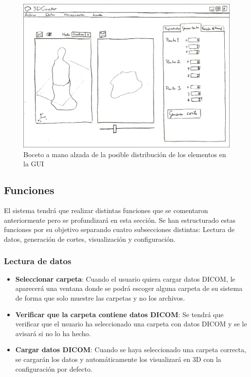 	\begin{figure}[H]
		\centering
		\includegraphics[width=12.5cm]{imagenes/basic_gui}
		\caption{Boceto a mano alzada de la posible distribución de los elementos en la GUI}
		\label{fig:basic_gui}
	\end{figure}
	
	\subsection{Funciones}
	
	El sistema tendrá que realizar distintas funciones que se comentaron anteriormente pero se profundizará en esta sección. Se han estructurado estas funciones por su objetivo separando cuatro subsecciones distintas: Lectura de datos, generación de cortes, visualización y configuración.
	
		\subsubsection{Lectura de datos}
		\begin{itemize}
			\item \textbf{Seleccionar carpeta}: Cuando el usuario quiera cargar datos DICOM, le aparecerá una ventana donde se podrá escoger alguna carpeta de su sistema de forma que solo muestre las carpetas y no los archivos.
			\item \textbf{Verificar que la carpeta contiene datos DICOM}: Se tendrá que verificar que el usuario ha seleccionado una carpeta con datos DICOM y se le avisará si no lo ha hecho.
			\item \textbf{Cargar datos DICOM}: Cuando se haya seleccionado una carpeta correcta, se cargarán los datos y automáticamente los visualizará en 3D con la configuración por defecto.
		\end{itemize}
	
